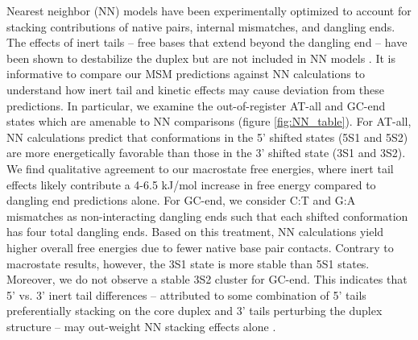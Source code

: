 \documentclass[journal=jpcbfk,manuscript=article]{achemso}
\begin{document}
Nearest neighbor (NN) models have been experimentally optimized to account for stacking contributions of native pairs, internal mismatches, and dangling ends\citep{Santalucia2004TM}. The effects of inert tails -- free bases that extend beyond the dangling end -- have been shown to destabilize the duplex but are not included in NN models \citep{Michele2014EHybridization}. It is informative to compare our MSM predictions against NN calculations to understand how inert tail and kinetic effects may cause deviation from these predictions. In particular, we examine  the out-of-register AT-all and GC-end states which are amenable to NN comparisons (figure \ref{fig:NN_table}). For AT-all, NN calculations  predict that conformations in the 5' shifted states (5S1 and 5S2) are more energetically favorable than those in the 3' shifted state (3S1 and 3S2). We find qualitative agreement to our macrostate free energies, where inert tail effects likely contribute a 4-6.5 kJ/mol increase in free energy compared to dangling end predictions alone. For GC-end, we consider C:T and G:A mismatches as non-interacting dangling ends such that each shifted conformation has four total dangling ends. Based on this treatment, NN calculations yield higher overall free energies due to fewer native base pair contacts.  Contrary to macrostate results, however, the 3S1 state is more stable than 5S1 states. Moreover, we do not observe a stable 3S2 cluster for GC-end. This indicates that 5' vs. 3' inert tail differences -- attributed to some combination of 5' tails preferentially stacking on the core duplex and 3' tails perturbing the duplex structure -- may out-weight NN stacking effects alone \citep{Doktycz1990ThermodynamicATGC}. 


\end{document}
